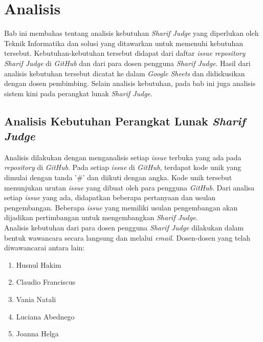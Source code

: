 \chapter{Analisis}
\label{chap:analisis}

Bab ini membahas tentang analisis kebutuhan \textit{Sharif Judge} yang diperlukan oleh Teknik Informatika dan solusi yang ditawarkan untuk memenuhi kebutuhan tersebut. Kebutuhan-kebutuhan tersebut didapat dari daftar \textit{issue} \textit{repository} \textit{Sharif Judge} di \textit{GitHub} dan dari para dosen pengguna \textit{Sharif Judge}. Hasil dari analisis kebutuhan tersebut dicatat ke dalam \textit{Google Sheets} dan didiskusikan dengan dosen pembimbing. Selain analisis kebutuhan, pada bab ini juga  analisis sistem kini pada perangkat lunak \textit{Sharif Judge}.


\section{Analisis Kebutuhan Perangkat Lunak \textit{Sharif Judge}}
\label{sec:analisis}
Analisis dilakukan dengan menganalisis setiap \textit{issue} terbuka yang ada pada \textit{repository} di \textit{GitHub}. Pada setiap \textit{issue} di \textit{GitHub}, terdapat kode unik yang dimulai dengan tanda '\#' dan diikuti dengan angka. Kode unik tersebut menunjukan urutan \textit{issue} yang dibuat oleh para pengguna \textit{GitHub}. Dari analisa setiap \textit{issue} yang ada, didapatkan beberapa pertanyaan dan usulan pengembangan. Beberapa \textit{issue} yang memiliki usulan pengembangan akan dijadikan pertimbangan untuk mengembangkan \textit{Sharif Judge}. \\

Analisis kebutuhan dari para dosen pengguna \textit{Sharif Judge} dilakukan dalam bentuk wawancara secara langsung dan melalui \textit{email}. Dosen-dosen yang telah diwawancarai antara lain:
\begin{enumerate}
	\item Husnul Hakim
	\item Claudio Franciscus
	\item Vania Natali
	\item Luciana Abednego
	\item Joanna Helga
\end{enumerate}

